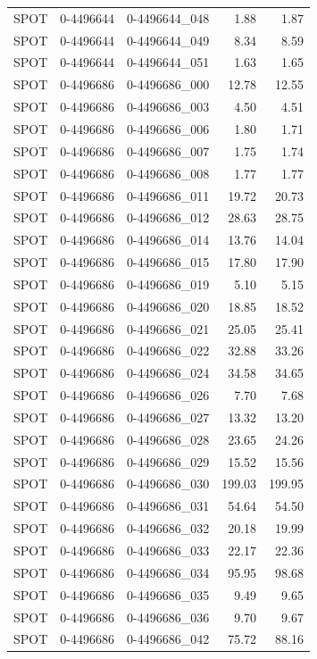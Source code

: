 \begin{tabular}{lllrr}
SPOT & 0-4496644 & 0-4496644_048 & 1.88 & 1.87 \\
SPOT & 0-4496644 & 0-4496644_049 & 8.34 & 8.59 \\
SPOT & 0-4496644 & 0-4496644_051 & 1.63 & 1.65 \\
SPOT & 0-4496686 & 0-4496686_000 & 12.78 & 12.55 \\
SPOT & 0-4496686 & 0-4496686_003 & 4.50 & 4.51 \\
SPOT & 0-4496686 & 0-4496686_006 & 1.80 & 1.71 \\
SPOT & 0-4496686 & 0-4496686_007 & 1.75 & 1.74 \\
SPOT & 0-4496686 & 0-4496686_008 & 1.77 & 1.77 \\
SPOT & 0-4496686 & 0-4496686_011 & 19.72 & 20.73 \\
SPOT & 0-4496686 & 0-4496686_012 & 28.63 & 28.75 \\
SPOT & 0-4496686 & 0-4496686_014 & 13.76 & 14.04 \\
SPOT & 0-4496686 & 0-4496686_015 & 17.80 & 17.90 \\
SPOT & 0-4496686 & 0-4496686_019 & 5.10 & 5.15 \\
SPOT & 0-4496686 & 0-4496686_020 & 18.85 & 18.52 \\
SPOT & 0-4496686 & 0-4496686_021 & 25.05 & 25.41 \\
SPOT & 0-4496686 & 0-4496686_022 & 32.88 & 33.26 \\
SPOT & 0-4496686 & 0-4496686_024 & 34.58 & 34.65 \\
SPOT & 0-4496686 & 0-4496686_026 & 7.70 & 7.68 \\
SPOT & 0-4496686 & 0-4496686_027 & 13.32 & 13.20 \\
SPOT & 0-4496686 & 0-4496686_028 & 23.65 & 24.26 \\
SPOT & 0-4496686 & 0-4496686_029 & 15.52 & 15.56 \\
SPOT & 0-4496686 & 0-4496686_030 & 199.03 & 199.95 \\
SPOT & 0-4496686 & 0-4496686_031 & 54.64 & 54.50 \\
SPOT & 0-4496686 & 0-4496686_032 & 20.18 & 19.99 \\
SPOT & 0-4496686 & 0-4496686_033 & 22.17 & 22.36 \\
SPOT & 0-4496686 & 0-4496686_034 & 95.95 & 98.68 \\
SPOT & 0-4496686 & 0-4496686_035 & 9.49 & 9.65 \\
SPOT & 0-4496686 & 0-4496686_036 & 9.70 & 9.67 \\
SPOT & 0-4496686 & 0-4496686_042 & 75.72 & 88.16 \\

\end{tabular}
